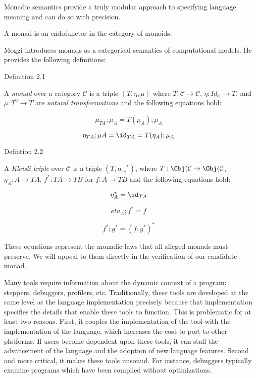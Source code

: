 \documentclass[ms]{byuprop}
\begin{document}
Monadic semantics provide a truly modular approach to specifying language meaning and can
do so with precision.


A monad is an endofunctor in the category of monoids.

Moggi \cite{moggi1989computational} introduces monads as a categorical semantics of
computational models. He provides the following definitions:

Definition 2.1

A \emph{monad} over a category $\mathcal{C}$ is a triple $(T,\eta,\mu)$ where
$T:\mathcal{C}\rightarrow\mathcal{C}$, $\eta:Id_{\mathcal{C}}\rightarrow T$, and
$\mu:T^{2}\rightarrow T$ are \emph{natural transformations} and the following equations
hold:

\[
\mu_{TA};\mu_{A}=T(\mu_{A});\mu_{A}
\]

\[
\eta_{TA};\mu{A}=\id_{TA}=T(\eta_{A});\mu_{A}
\]

Defintion 2.2

A \emph{Kleisli triple} over $\mathcal{C}$ is a triple $(T,\eta,\_^{*})$, where
$T:\Obj(\mathcal{C}\rightarrow \Obj(\mathcal{C}$, $\eta_{A}:A\rightarrow TA$,
$f^{*}:TA\rightarrow TB$ for $f:A\rightarrow TB$ and the following equations hold:

\[
\eta_{A}^{*}=\id_{TA}
\]

\[
eta_{A};f^{*}=f
\]

\[
f^{*};g^{*}=(f;g^{*})^{*}
\]

These equations represent the monadic laws that all alleged monads must preserve. We will
appeal to them directly in the verification of our candidate monad.


Many tools require information about the dynamic context of a program: steppers,
debuggers, profilers, etc. Traditionally, these tools are developed at the same level as
the language implementation precisely because that implementation specifies the details
that enable these tools to function. This is problematic for at least two reasons. First,
it couples the implementation of the tool with the implementation of the language, which
increases the cost to port to other platforms. If users become dependent upon these tools,
it can stall the advancement of the language and the adoption of new language features.
Second and more critical, it makes these tools unsound. For instance, debuggers typically
examine programs which have been compiled without optimizations.
\end{document}

